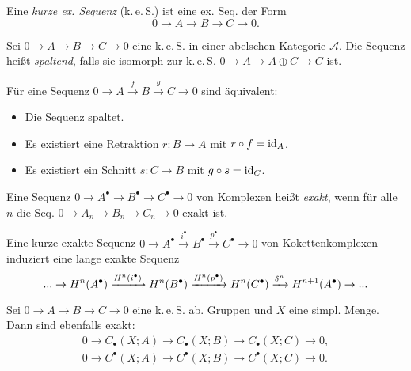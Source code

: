 \documentclass{cheat-sheet}
\newcommand{\CC}[1]{{#1}_{\bullet}} %
\newcommand{\CCC}[1]{{#1}^{\bullet}} %
\newcommand{\keS}{k.\,e.\,S.} %
\begin{document}
\begin{defn}
  Eine \emph{kurze ex. Sequenz} (\keS{}) ist eine ex. Seq. der Form
  \[ 0 \to A \to B \to C \to 0. \]
\end{defn}

\begin{defn}
  Sei $0 \to A \to B \to C \to 0$ eine \keS{} in einer abelschen Kategorie $\mathcal{A}$. Die Sequenz heißt \emph{spaltend}, falls sie isomorph zur \keS{} $0 \to A \to A \oplus C \to C$ ist.
\end{defn}

\begin{prop}
  Für eine Sequenz $0 \to A \xrightarrow{f} B \xrightarrow{g} C \to 0$ sind äquivalent:
  \begin{itemize}
    \item Die Sequenz spaltet.
    \item Es existiert eine Retraktion $r : B \to A$ mit $r \circ f = \operatorname{id}_A$.
    \item Es existiert ein Schnitt $s : C \to B$ mit $g \circ s = \operatorname{id}_C$.
  \end{itemize}
\end{prop}

\begin{defn}
  Eine Sequenz $0 \to \CCC{A} \to \CCC{B} \to \CCC{C} \to 0$ von Komplexen heißt \emph{exakt}, wenn für alle $n$ die Seq. $0 \to A_n \to B_n \to C_n \to 0$ exakt ist.
\end{defn}


\begin{prop}
  Eine kurze exakte Sequenz
  $0 \to \CCC{A} \xrightarrow{i^\bullet} \CCC{B} \xrightarrow{p^\bullet} \CCC{C} \to 0$
  von Kokettenkomplexen induziert eine lange exakte Sequenz
  \[ \nldots \to H^n(\CCC{A}) \xrightarrow{H^n(i^\bullet)} H^n(\CCC{B}) \xrightarrow{H^n(p^\bullet)} H^n(\CCC{C}) \xrightarrow{\delta^n} H^{n+1}(\CCC{A}) \to \nldots \]
\end{prop}

\begin{lem}
  Sei $0 \to A \to B \to C \to 0$ eine \keS{} ab. Gruppen und $X$ eine simpl. Menge.
  Dann sind ebenfalls exakt:
  \begin{align*}
    0 \to \CC{C}(X; A) \to \CC{C}(X; B) \to \CC{C}(X; C) \to 0, \\
    0 \to \CCC{C}(X; A) \to \CCC{C}(X; B) \to \CCC{C}(X; C) \to 0.
  \end{align*}
\end{lem}
\end{document}

